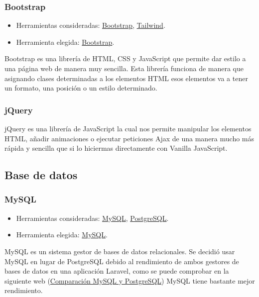 \subsubsection{Bootstrap}
\begin{itemize}
    \item Herramientas consideradas: \href{https://getbootstrap.com/}{Bootstrap}, \href{https://tailwindcss.com/}{Tailwind}.
	\item Herramienta elegida: \href{https://getbootstrap.com/}{Bootstrap}.
\end{itemize}

Bootstrap es una librería de HTML, CSS y JavaScript que permite dar estilo a una página web de manera muy sencilla. Esta librería funciona de manera que asignando clases determinadas a los elementos HTML esos elementos va a tener un formato, una posición o un estilo determinado.

\subsubsection{jQuery}

jQuery es una librería de JavaScript la cual nos permite manipular los elementos HTML, añadir animaciones o ejecutar peticiones Ajax de una manera mucho más rápida y sencilla que si lo hiciermas directamente con Vanilla JavaScript. 

\subsection{Base de datos}

\subsubsection{MySQL}
\begin{itemize}
    \item Herramientas consideradas: \href{https://www.mysql.com/}{MySQL},
    \href{https://www.postgresql.org/}{PostgreSQL}.
	\item Herramienta elegida: \href{https://www.mysql.com/}{MySQL}.
\end{itemize}

MySQL es un sistema gestor de bases de datos relacionales. Se decidió usar MySQL en lugar de PostgreSQL debido al rendimiento de ambos gestores de bases de datos en una aplicación Laravel, como se puede comprobar en la siguiente web (\href{https://medium.com/web-developer/mysql-vs-postgresql-performance-test-with-laravel-api-for-simple-eloquent-queries-on-1-million-6e0e6f1005b8}{Comparación MySQL y PostgreSQL}) MySQL tiene bastante mejor rendimiento.

